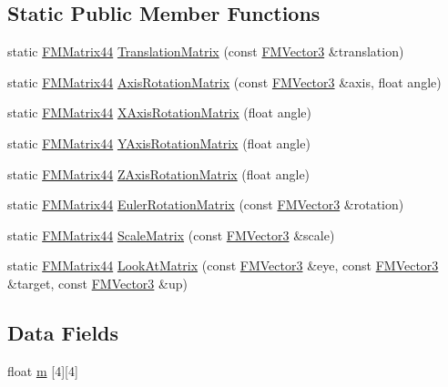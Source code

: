 \subsection*{Static Public Member Functions}
\begin{DoxyCompactItemize}
\item 
static \hyperlink{classFMMatrix44}{FMMatrix44} \hyperlink{classFMMatrix44_a5acef07c11f705a90d8746eb13d01379}{TranslationMatrix} (const \hyperlink{classFMVector3}{FMVector3} \&translation)
\item 
static \hyperlink{classFMMatrix44}{FMMatrix44} \hyperlink{classFMMatrix44_a91daf75ee43a86488849fbf3f8b865f6}{AxisRotationMatrix} (const \hyperlink{classFMVector3}{FMVector3} \&axis, float angle)
\item 
static \hyperlink{classFMMatrix44}{FMMatrix44} \hyperlink{classFMMatrix44_ab2fbbb135c1ef2dfceb2e46c985d99ee}{XAxisRotationMatrix} (float angle)
\item 
static \hyperlink{classFMMatrix44}{FMMatrix44} \hyperlink{classFMMatrix44_ac8eb6bcdb7b7a9e384453df3fcaa4971}{YAxisRotationMatrix} (float angle)
\item 
static \hyperlink{classFMMatrix44}{FMMatrix44} \hyperlink{classFMMatrix44_a224760f24d5df84ee84aad10b191b1fe}{ZAxisRotationMatrix} (float angle)
\item 
static \hyperlink{classFMMatrix44}{FMMatrix44} \hyperlink{classFMMatrix44_a7175333ab00a568082241ac08d7b6c89}{EulerRotationMatrix} (const \hyperlink{classFMVector3}{FMVector3} \&rotation)
\item 
static \hyperlink{classFMMatrix44}{FMMatrix44} \hyperlink{classFMMatrix44_ae87b95958aa655b805d177fdc628edf9}{ScaleMatrix} (const \hyperlink{classFMVector3}{FMVector3} \&scale)
\item 
static \hyperlink{classFMMatrix44}{FMMatrix44} \hyperlink{classFMMatrix44_a426d208ddd9b8a47156b81c5ae0e23bf}{LookAtMatrix} (const \hyperlink{classFMVector3}{FMVector3} \&eye, const \hyperlink{classFMVector3}{FMVector3} \&target, const \hyperlink{classFMVector3}{FMVector3} \&up)
\end{DoxyCompactItemize}
\subsection*{Data Fields}
\begin{DoxyCompactItemize}
\item 
float \hyperlink{classFMMatrix44_a709b1f27940c291ea1482866d3a165d0}{m} \mbox{[}4\mbox{]}\mbox{[}4\mbox{]}
\end{DoxyCompactItemize}
